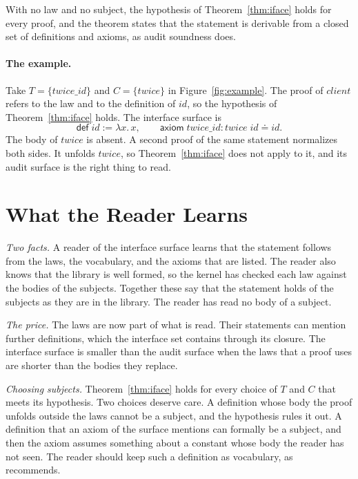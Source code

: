 \documentclass[acmsmall,nonacm,screen]{acmart}
\newcommand{\eqd}{\doteq}
\newcommand{\kw}[1]{\mathsf{#1}}
\newcommand{\nm}[1]{\mathit{#1}}
\begin{document}
With no law and no subject, the hypothesis of Theorem~\ref{thm:iface} holds for every proof, and
the theorem states that the statement is derivable from a closed set of definitions and axioms,
as audit soundness does.

\paragraph{The example.}
Take $T = \{\nm{twice\_id}\}$ and $C = \{\nm{twice}\}$ in Figure~\ref{fig:example}. The proof of
$\nm{client}$ refers to the law and to the definition of $\nm{id}$, so the hypothesis of
Theorem~\ref{thm:iface} holds. The interface surface is
\[
\kw{def}\;\nm{id} := \lambda x.\,x, \qquad
\kw{axiom}\;\nm{twice\_id} : \nm{twice}\;\nm{id} \eqd \nm{id} .
\]
The body of $\nm{twice}$ is absent. A second proof of the same statement normalizes both sides.
It unfolds $\nm{twice}$, so Theorem~\ref{thm:iface} does not apply to it, and its audit surface
is the right thing to read.

\section{What the Reader Learns}
\label{sec:reading}

\emph{Two facts.} A reader of the interface surface learns that the statement follows from the
laws, the vocabulary, and the axioms that are listed. The reader also knows that the library is
well formed, so the kernel has checked each law against the bodies of the subjects. Together
these say that the statement holds of the subjects as they are in the library. The reader has
read no body of a subject.

\emph{The price.} The laws are now part of what is read. Their statements can mention further
definitions, which the interface set contains through its closure. The interface surface is
smaller than the audit surface when the laws that a proof uses are shorter than the bodies they
replace.

\emph{Choosing subjects.} Theorem~\ref{thm:iface} holds for every choice of $T$ and $C$ that
meets its hypothesis. Two choices deserve care. A definition whose body the proof unfolds
outside the laws cannot be a subject, and the hypothesis rules it out. A definition that an
axiom of the surface mentions can formally be a subject, and then the axiom assumes something
about a constant whose body the reader has not seen. The reader should keep such a definition as
vocabulary, as~\citet{tpp1} recommends.
\end{document}
